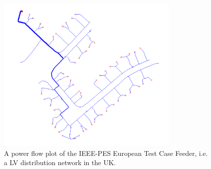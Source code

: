 \begin{figure}\centering
	\includegraphics[width=0.8\textwidth]{_chapter1/fig/network-plot-LVTestCase}
	\caption{A power flow plot of the IEEE-PES European Test Case Feeder, i.e. a LV distribution network in the UK.}
	\label{ch1:fig:network-plot-LVTestCase}
\end{figure}